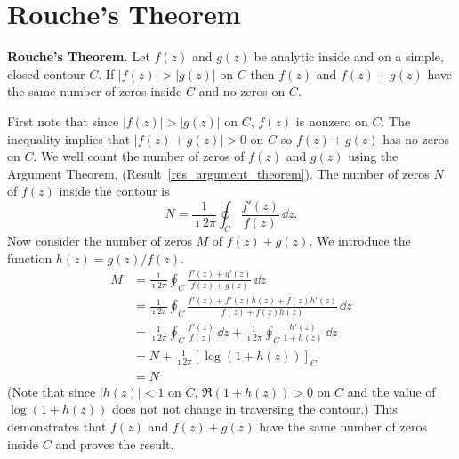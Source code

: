 





\section{Rouche's Theorem}



\begin{Result}
  \label{rouches_theorem}
  \textbf{Rouche's Theorem.}
  Let $f(z)$ and $g(z)$ be analytic inside and on a simple, closed contour
  $C$.   If $|f(z)| > |g(z)|$ on $C$ then $f(z)$ and $f(z) + g(z)$ have
  the same number of zeros inside $C$ and no zeros on $C$.
\end{Result}


First note that since $|f(z)| > |g(z)|$ on $C$, $f(z)$ is nonzero on $C$.
The inequality implies that $|f(z) + g(z)| > 0$ on $C$ so $f(z) + g(z)$
has no zeros on $C$.  We well count the number of zeros of $f(z)$ and 
$g(z)$ using the Argument Theorem, (Result~\ref{res_argument_theorem}). 
The number of zeros $N$ of $f(z)$ inside the contour is 
\[
N = \frac{1}{\imath 2 \pi} \oint_C \frac{ f'(z) }{ f(z) } \,\dd z.
\]
Now consider the number of zeros $M$ of $f(z) + g(z)$.  We introduce the
function $h(z) = g(z) / f(z)$.
\begin{align*}
  M       
  &= \frac{1}{\imath 2 \pi} \oint_C \frac{ f'(z) + g'(z) }{ f(z) + g(z) }\,\dd z 
  \\
  &= \frac{1}{\imath 2 \pi} \oint_C \frac{ f'(z) + f'(z) h(z) + f(z) h'(z) }
  { f(z) + f(z) h(z) }\,\dd z 
  \\
  &= \frac{1}{\imath 2 \pi} \oint_C \frac{ f'(z) }{ f(z) } \,\dd z
  + \frac{1}{\imath 2 \pi} \oint_C \frac{ h'(z) }{ 1 + h(z) } \,\dd z 
  \\
  &= N + \frac{1}{\imath 2 \pi} \left[ \log(1 + h(z)) \right]_C 
  \\
  &= N
\end{align*}
(Note that since $|h(z)| < 1$ on $C$, $\Re(1 + h(z)) > 0$ on $C$
and the value of $\log(1 + h(z))$ does not not change in traversing the
contour.)
This demonstrates that $f(z)$ and $f(z) + g(z)$ have the same number of 
zeros inside $C$ and proves the result.















